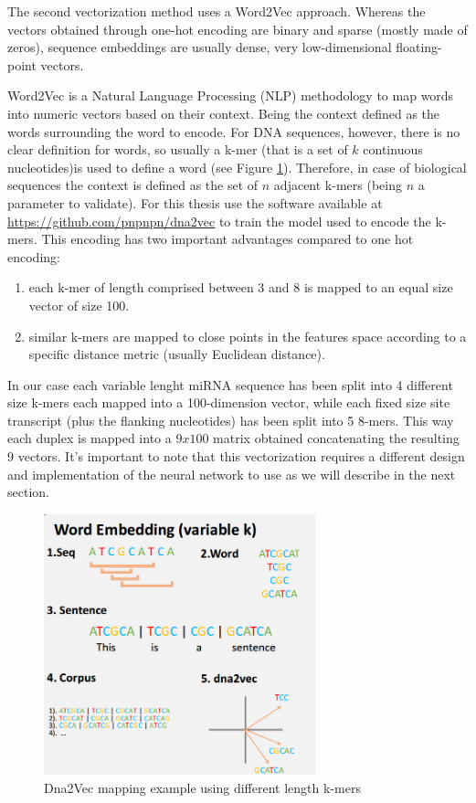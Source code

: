 The second vectorization method uses a Word2Vec approach. Whereas the vectors obtained through one-hot encoding are binary and sparse (mostly made of zeros), sequence embeddings are usually dense, very low-dimensional floating-point vectors. 

Word2Vec \cite{word2vec} is a Natural Language Processing (NLP) methodology to map words into numeric vectors based on their context. Being the context defined as the words surrounding the word to encode. For DNA sequences, however, there is no clear definition for words, so usually a k-mer (that is a set of $k$ continuous nucleotides)is used to define a word (see Figure \ref{fig:dna2vec}). Therefore, in case of biological sequences the context is defined as the set of $n$ adjacent k-mers (being $n$ a parameter to validate). For this thesis use the software available at \url{https://github.com/pnpnpn/dna2vec} to train the model used to encode the k-mers. This encoding has two important advantages compared to one hot encoding:

\begin{enumerate}
	\item each k-mer of length comprised between 3 and 8 is mapped to an equal size vector of size 100.
	\item similar k-mers are mapped to close points in the features space according to a specific distance metric (usually Euclidean distance).
\end{enumerate}

In our case each variable lenght miRNA sequence has been split into 4 different size k-mers each mapped into a 100-dimension vector, while each fixed size site transcript (plus the flanking nucleotides) has been split into 5 8-mers. This way each duplex is mapped into a $9x100$ matrix obtained concatenating the resulting 9 vectors. It's important to note that this vectorization requires a different design and implementation of the neural network to use as we will describe in the next section.

\begin{figure}[hbt!]
	\centering
	\includegraphics[width=0.7\textwidth, height=0.3\textheight]{Figures/dna2vec}
	\caption{Dna2Vec mapping example using different length k-mers}
	\label{fig:dna2vec}
\end{figure}

